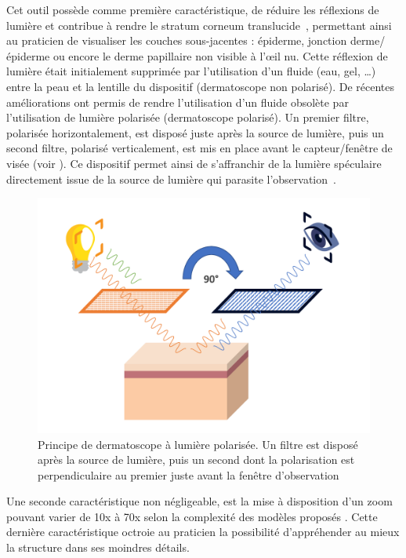 Cet outil possède comme première caractéristique, de réduire les réflexions de lumière et contribue à rendre le stratum corneum translucide~\cite{Katz2001}, permettant ainsi au praticien de visualiser les couches sous-jacentes : épiderme, jonction derme/épiderme ou encore le derme papillaire non visible à l’œil nu. Cette réflexion de lumière était initialement supprimée par l’utilisation d’un fluide (eau, gel, …) entre la peau et la lentille du dispositif (dermatoscope non polarisé). De récentes améliorations ont permis de rendre l'utilisation d'un fluide obsolète par l'utilisation de lumière polarisée (dermatoscope polarisé). Un premier filtre, polarisée horizontalement, est disposé juste après la source de lumière, puis un second filtre, polarisé verticalement, est mis en place avant le capteur/fenêtre de visée (voir ). Ce dispositif permet ainsi de s'affranchir de la lumière spéculaire directement issue de la source de lumière qui parasite l'observation~\cite{Campos-do-Carmo2008}.\par

\begin{figure}[H]
\centering
    \includegraphics[width=0.7\linewidth]{contents/chapter_2/resources/scheme_polarized_dermoscopy.pdf}
    \caption{Principe de dermatoscope à lumière polarisée. Un filtre est disposé après la source de lumière, puis un second dont la polarisation est perpendiculaire au premier juste avant la fenêtre d'observation~\cite{sonthalia2019}}
    \label{fig:scheme_polarized_dermoscopy}
\end{figure}\par

Une seconde caractéristique non négligeable, est la mise à disposition d’un zoom pouvant varier de 10x à 70x selon la complexité des modèles proposés \cite{Campos-do-Carmo2008}. Cette dernière caractéristique octroie au praticien la possibilité d’appréhender au mieux la structure dans ses moindres détails.\par


